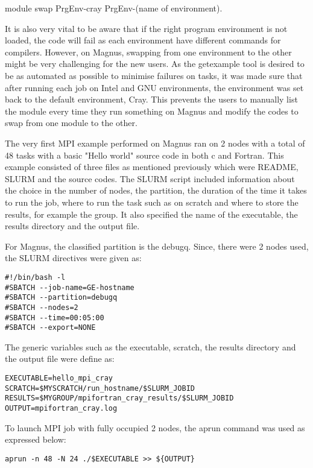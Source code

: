\documentclass[journal]{IEEEtran}
\begin{document}
\begin{verbatim*}
module swap PrgEnv-cray PrgEnv-(name of environment). 
\end{verbatim*}

It is also very vital to be aware that if the right program environment is not loaded, the code will fail as each environment have different commands 
for compilers. However, on Magnus, swapping from one environment to the other might be very challenging for the new users. As the getexample tool is
desired to be as automated as possible to minimise failures on tasks, it was made sure that after running each job on Intel and GNU environments, the
environment was set back to the default environment, Cray. This prevents the users to manually list the module every time they run something on Magnus
and modify the codes to swap from one module to the other. 

The very first MPI example performed on Magnus ran on 2 nodes with a total of 48 tasks with a basic "Hello world" source code in both c and Fortran. 
This example consisted of three files as mentioned previously which were README, SLURM and the source codes. The SLURM script included information about
the choice in the number of nodes, the partition, the duration of the time it takes to run the job, where to run the task such as on scratch and where
to store the results, for example the group. It also specified the name of the executable, the results directory and the output file. 

For Magnus, the classified partition is the debugq. Since, there were 2 nodes used, the SLURM directives were given as:

\begin{verbatim}
#!/bin/bash -l
#SBATCH --job-name=GE-hostname
#SBATCH --partition=debugq
#SBATCH --nodes=2
#SBATCH --time=00:05:00
#SBATCH --export=NONE
\end{verbatim}

The generic variables such as the executable, scratch, the results directory and the output file were define as:

\begin{verbatim}
EXECUTABLE=hello_mpi_cray
SCRATCH=$MYSCRATCH/run_hostname/$SLURM_JOBID
RESULTS=$MYGROUP/mpifortran_cray_results/$SLURM_JOBID
OUTPUT=mpifortran_cray.log 
\end{verbatim}

To launch MPI job with fully occupied 2 nodes, the aprun command was used as expressed below:

\begin{verbatim}
aprun -n 48 -N 24 ./$EXECUTABLE >> ${OUTPUT}
\end{verbatim}
\end{document}

